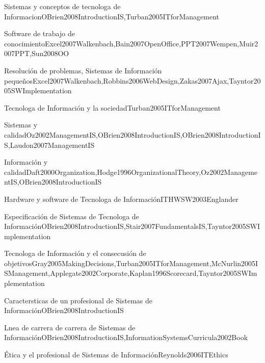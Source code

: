 \begin{LU1}{Sistemas y conceptos de tecnolog­a de Informacion}{OBrien2008IntroductionIS,Turban2005ITforManagement}{}
\begin{LU2}{Software de trabajo de conocimiento}{Excel2007Walkenbach,Bain2007OpenOffice,PPT2007Wempen,Muir2007PPT,Sun2008OO}{}
\begin{LU3}{Resolución de problemas, Sistemas de Información pequeños}{Excel2007Walkenbach,Robbins2006WebDesign,Zakas2007Ajax,Tayntor2005SWImplementation}{}
\begin{LU4}{Tecnolog­a de Información y la sociedad}{Turban2005ITforManagement}{}
\begin{LU5}{Sistemas y calidad}{Oz2002ManagementIS,OBrien2008IntroductionIS,OBrien2008IntroductionIS,Laudon2007ManagementIS}{}
\begin{LU6}{Información y calidad}{Daft2000Organization,Hodge1996OrganizationalTheory,Oz2002ManagementIS,OBrien2008IntroductionIS}{}
\begin{LU7}{Hardware y software de Tecnolog­a de Información}{ITHWSW2003Englander}{}
\begin{LU8}{Especificación de Sistemas de Tecnolog­a de Información}{OBrien2008IntroductionIS,Stair2007FundamentalsIS,Tayntor2005SWImplementation}{}
\begin{LU9}{Tecnolog­a de Información y el consecusión de objetivos}{Gray2005MakingDecisions,Turban2005ITforManagement,McNurlin2005ISManagement,Applegate2002Corporate,Kaplan1996Scorecard,Tayntor2005SWImplementation}{}
\begin{LU10}{Caracter­sticas de un profesional de Sistemas de Información}{OBrien2008IntroductionIS}{}
\begin{LU11}{L­nea de carrera de carrera de Sistemas de Información}{OBrien2008IntroductionIS,InformationSystemsCurricula2002Book}{}
\begin{LU12}{Ética y el profesional de Sistemas de Información}{Reynolds2006ITEthics}{}
\end{LU12}
\end{LU11}
\end{LU10}
\end{LU9}
\end{LU8}
\end{LU7}
\end{LU6}
\end{LU5}
\end{LU4}
\end{LU3}
\end{LU2}
\end{LU1}
